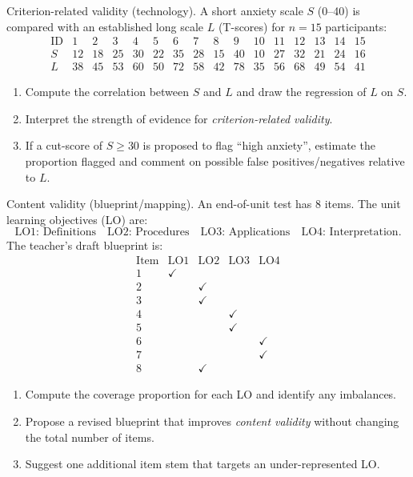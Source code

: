 \documentclass[11pt]{article}
\def\textbf#1{#1}%
\newcounter{question}
\begin{document}
\begin{question}
\textbf{Criterion-related validity (technology).}
A short anxiety scale $S$ (0–40) is compared with an established long scale $L$ (T-scores) for $n=15$ participants:
\[
\begin{array}{c|ccccccccccccccc}
\text{ID}&1&2&3&4&5&6&7&8&9&10&11&12&13&14&15\\\hline
S&12&18&25&30&22&35&28&15&40&10&27&32&21&24&16\\
L&38&45&53&60&50&72&58&42&78&35&56&68&49&54&41
\end{array}
\]
\begin{enumerate}
  \item Compute the correlation between $S$ and $L$ and draw the regression of $L$ on $S$.
  \item Interpret the strength of evidence for \emph{criterion-related validity}.
  \item If a cut-score of $S\ge 30$ is proposed to flag “high anxiety”, estimate the proportion flagged and comment on possible false positives/negatives relative to $L$.
\end{enumerate}
\end{question}

\begin{question}
\textbf{Content validity (blueprint/mapping).}
An end-of-unit test has 8 items. The unit learning objectives (LO) are:
\[
\text{LO1: Definitions}\quad
\text{LO2: Procedures}\quad
\text{LO3: Applications}\quad
\text{LO4: Interpretation}.
\]
The teacher’s draft blueprint is:
\[
\begin{array}{c|cccc}
\text{Item} & \text{LO1} & \text{LO2} & \text{LO3} & \text{LO4}\\\hline
1 & \checkmark & & & \\
2 &  & \checkmark & & \\
3 &  & \checkmark & & \\
4 &  &  & \checkmark & \\
5 &  &  & \checkmark & \\
6 &  &  &  & \checkmark \\
7 &  &  &  & \checkmark \\
8 &  & \checkmark &  & 
\end{array}
\]
\begin{enumerate}
  \item Compute the coverage proportion for each LO and identify any imbalances.
  \item Propose a revised blueprint that improves \emph{content validity} without changing the total number of items.
  \item Suggest one additional item stem that targets an under-represented LO.
\end{enumerate}
\end{question}
\end{document}
